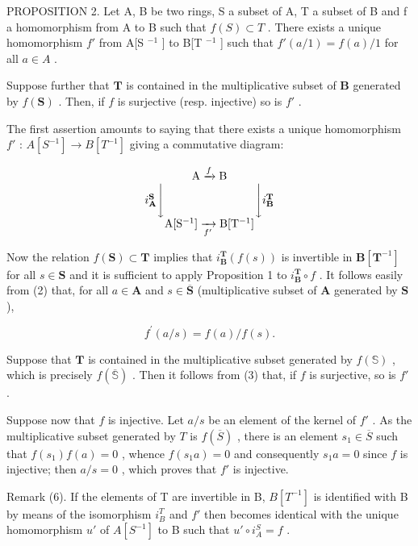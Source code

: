 PROPOSITION 2. Let A, B be two rings, S a subset of A, T a subset of B and f a homomorphism from A to B such that \(f(S) \subset T\) . There exists a unique homomorphism \(f'\) from A{[}S \(^{-1}\) {]} to B{[}T \(^{-1}\) {]} such that \(f'(a/1) = f(a)/1\) for all \(a \in A\) .

Suppose further that \(\mathbf{T}\) is contained in the multiplicative subset of \(\mathbf{B}\) generated by \(f(\mathbf{S})\) . Then, if \(f\) is surjective (resp. injective) so is \(f'\) .

The first assertion amounts to saying that there exists a unique homomorphism \(f'\) : \(A[S^{-1}] \to B[T^{-1}]\) giving a commutative diagram:

\[
\begin{array}{c} \mathrm{A} \xrightarrow {f} \mathrm{B} \\ i _ {\mathbf {A}} ^ {\mathbf {S}} \Biggl \downarrow \qquad \qquad \qquad \qquad \Biggl \downarrow i _ {\mathbf {B}} ^ {\mathbf {T}} \\ \mathrm{A} [ \mathrm{S} ^ {- 1} ] \xrightarrow [ f ^ {\prime} ]{} \mathrm{B} [ \mathrm{T} ^ {- 1} ] \end{array}
\]

Now the relation \(f(\mathbf{S}) \subset \mathbf{T}\) implies that \(i_{\mathbf{B}}^{\mathbf{T}}(f(s))\) is invertible in \(\mathbf{B}[\mathbf{T}^{-1}]\) for all \(s \in \mathbf{S}\) and it is sufficient to apply Proposition 1 to \(i_{\mathbf{B}}^{\mathbf{T}} \circ f\) . It follows easily from (2) that, for all \(a \in \mathbf{A}\) and \(s \in \overline{\mathbf{S}}\) (multiplicative subset of \(\mathbf{A}\) generated by \(\mathbf{S}\) ),

\[
f ^ {\prime} (a / s) = f (a) / f (s).\tag{3}
\]

Suppose that \(\mathbf{T}\) is contained in the multiplicative subset generated by \(f(\mathbb{S})\) , which is precisely \(f(\overline{\mathbb{S}})\) . Then it follows from (3) that, if \(f\) is surjective, so is \(f'\) .

Suppose now that \(f\) is injective. Let \(a / s\) be an element of the kernel of \(f'\) . As the multiplicative subset generated by \(T\) is \(f(\overline{S})\) , there is an element \(s_1 \in \overline{S}\) such that \(f(s_1)f(a) = 0\) , whence \(f(s_1a) = 0\) and consequently \(s_1a = 0\) since \(f\) is injective; then \(a / s = 0\) , which proves that \(f'\) is injective.

Remark (6). If the elements of T are invertible in B, \(B[T^{-1}]\) is identified with B by means of the isomorphism \(i_{B}^{T}\) and \(f'\) then becomes identical with the unique homomorphism \(u'\) of \(A[S^{-1}]\) to B such that \(u' \circ i_{A}^{S} = f\) .


